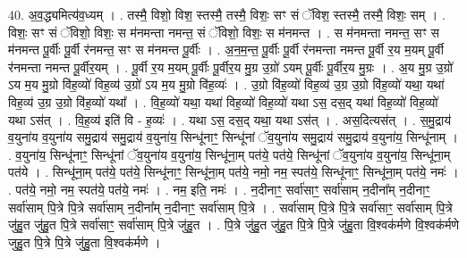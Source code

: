 \documentclass[17pt]{extarticle}
\begin{document}
40. अ॒व॒द्ध्यमित्य॑व॒ध्यम् । . तस्मै॒ विशो॒ विश॒ स्तस्मै॒ तस्मै॒ विशः॒ सꣳ सं ॅविश॒ स्तस्मै॒ तस्मै॒ विशः॒ सम् । . विशः॒ सꣳ सं ॅविशो॒ विशः॒ स म॑नमन्ता नमन्त॒ सं ॅविशो॒ विशः॒ स म॑नमन्त । . स म॑नमन्ता नमन्त॒ सꣳ स म॑नमन्त पू॒र्वीः पू॒र्वी र॑नमन्त॒ सꣳ स म॑नमन्त पू॒र्वीः । . अ॒न॒म॒न्त॒ पू॒र्वीः पू॒र्वी र॑नमन्ता नमन्त पू॒र्वी र॒य म॒यम् पू॒र्वी र॑नमन्ता नमन्त पू॒र्वीर॒यम् । . पू॒र्वी र॒य म॒यम् पू॒र्वीः पू॒र्वीर॒य मु॒ग्र उ॒ग्रो॑ ऽयम् पू॒र्वीः पू॒र्वीर॒य मु॒ग्रः । . अ॒य मु॒ग्र उ॒ग्रो॑ ऽय म॒य मु॒ग्रो वि॑ह॒व्यो॑ विह॒व्य॑ उ॒ग्रो॑ ऽय म॒य मु॒ग्रो वि॑ह॒व्यः॑ । . उ॒ग्रो वि॑ह॒व्यो॑ विह॒व्य॑ उ॒ग्र उ॒ग्रो वि॑ह॒व्यो॑ यथा॒ यथा॑ विह॒व्य॑ उ॒ग्र उ॒ग्रो वि॑ह॒व्यो॑ यथा᳚ । . वि॒ह॒व्यो॑ यथा॒ यथा॑ विह॒व्यो॑ विह॒व्यो॑ यथा ऽस॒ दस॒द् यथा॑ विह॒व्यो॑ विह॒व्यो॑ यथा ऽस॑त् । . वि॒ह॒व्य॑ इति॑ वि - ह॒व्यः॑ । . यथा ऽस॒ दस॒द् यथा॒ यथा ऽस॑त् । . अस॒दित्यस॑त् । . स॒मु॒द्राय॑ व॒युना॑य व॒युना॑य समु॒द्राय॑ समु॒द्राय॑ व॒युना॑य॒ सिन्धू॑नाꣳ॒॒ सिन्धू॑नां ॅव॒युना॑य समु॒द्राय॑ समु॒द्राय॑ व॒युना॑य॒ सिन्धू॑नाम् । . व॒युना॑य॒ सिन्धू॑नाꣳ॒॒ सिन्धू॑नां ॅव॒युना॑य व॒युना॑य॒ सिन्धू॑ना॒म् पत॑ये॒ पत॑ये॒ सिन्धू॑नां ॅव॒युना॑य व॒युना॑य॒ सिन्धू॑ना॒म् पत॑ये । . सिन्धू॑ना॒म् पत॑ये॒ पत॑ये॒ सिन्धू॑नाꣳ॒॒ सिन्धू॑ना॒म् पत॑ये॒ नमो॒ नम॒ स्पत॑ये॒ सिन्धू॑नाꣳ॒॒ सिन्धू॑ना॒म् पत॑ये॒ नमः॑ । . पत॑ये॒ नमो॒ नम॒ स्पत॑ये॒ पत॑ये॒ नमः॑ । . नम॒ इति॒ नमः॑ । . न॒दीनाꣳ॒॒ सर्वा॑साꣳ॒॒ सर्वा॑साम् न॒दीना᳚म् न॒दीनाꣳ॒॒ सर्वा॑साम् पि॒त्रे पि॒त्रे सर्वा॑साम् न॒दीना᳚म् न॒दीनाꣳ॒॒ सर्वा॑साम् पि॒त्रे । . सर्वा॑साम् पि॒त्रे पि॒त्रे सर्वा॑साꣳ॒॒ सर्वा॑साम् पि॒त्रे जु॑हु॒त जु॑हु॒त पि॒त्रे सर्वा॑साꣳ॒॒ सर्वा॑साम् पि॒त्रे जु॑हु॒त । . पि॒त्रे जु॑हु॒त जु॑हु॒त पि॒त्रे पि॒त्रे जु॑हु॒ता वि॒श्वक॑र्मणे वि॒श्वक॑र्मणे जुहु॒त पि॒त्रे पि॒त्रे जु॑हु॒ता वि॒श्वक॑र्मणे । \newline
\end{document}
